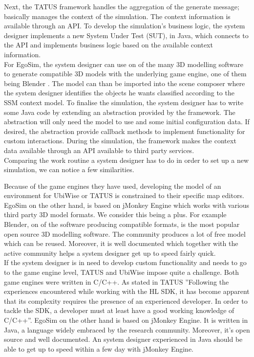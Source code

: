 Next, the TATUS framework handles the aggregation of the generate message; basically manages the context of the simulation. The context information is available through an API. To develop the simulation's business logic, the system designer implements a new System Under Test (SUT), in Java, which connects to the API and implements business logic based on the available context information.\\

For EgoSim, the system designer can use on of the many 3D modelling software to generate compatible 3D models with the underlying game engine, one of them being Blender \cite{blender:online}. The model can than be imported into the scene composer where the system designer identifies the objects he wants classified according to the SSM context model. To finalise the simulation, the system designer has to write some Java code by extending an abstraction provided by the framework. The abstraction will only need the model to use and some initial configuration data. If desired, the abstraction provide callback methods to implement functionality for custom interactions. During the simulation, the framework makes the context data available through an API available to third party services.\\

Comparing the work routine a system designer has to do in order to set up a new simulation, we can notice a few similarities. 

Because of the game engines they have used, developing the model of an environment for UbiWise or TATUS is constrained to their specific map editors. EgoSim on the other hand, is based on jMonkey Engine which works with various third party 3D model formats. We consider this being a plus. For example Blender, on of the software producing compatible formats, is the most popular open source 3D modelling software. The community produces a lot of free model which can be reused. Moreover, it is well documented which together with the active community helps a system designer get up to speed fairly quick.\\

If the system designer is in need to develop custom functionality and needs to go to the game engine level, TATUS and UbiWise impose quite a challenge. Both game engines were written in C/C++. As stated in TATUS ''Following the experiences encountered while working with the HL SDK, it has become apparent that its complexity requires the presence of an experienced developer. In order to tackle the SDK, a developer must at least have a good working knowledge of C/C++''. EgoSim on the other hand is based on jMonkey Engine. It is written in Java, a language widely embraced by the research community. Moreover, it's open source and well documented. An system designer experienced in Java should be able to get up to speed within a few day with jMonkey Engine.\\

